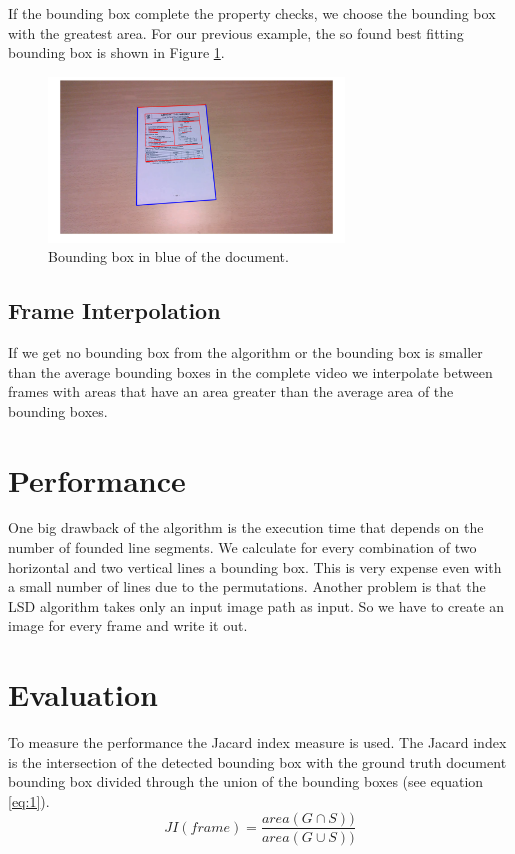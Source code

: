 \documentclass[english, paper=a4]{scrartcl}
\begin{document}
If the bounding box complete the property checks, we choose the bounding box with the greatest area. 
For our previous example, the so found best fitting bounding box is shown in Figure \ref{fig:bb}.
\begin{figure}[h]
\centering
\includegraphics[width=0.7\textwidth]{bb.png}
\caption{Bounding box in blue of the document.}
\label{fig:bb}
\end{figure}

\subsection{Frame Interpolation}
If we get no bounding box from the algorithm or the bounding box is smaller than the average bounding boxes in the complete video we interpolate between frames with areas that have an area greater than the average area of the bounding boxes.

\section{Performance}
One big drawback of the algorithm is the execution time that depends on the number of founded line segments. We calculate for every combination of two horizontal and two vertical lines a bounding box. This is very expense even with a small number of lines due to the permutations. Another problem is that the LSD algorithm takes only an input image path as input. So we have to create an image for every frame and write it out.

\section{Evaluation}
To measure the performance the Jacard index measure \cite{everingham2010pascal} is used. 
The Jacard index is the intersection of the detected bounding box with the ground truth document bounding box divided through the union of the bounding boxes (see equation \ref{eq:1}).
\begin{equation}\label{eq:1}
JI(frame)= \frac{area(G\cap S))}{area(G\cup S))}
\end{equation}
\end{document}
